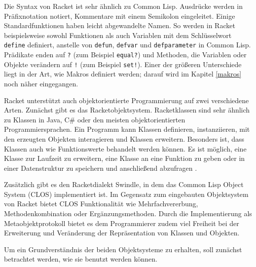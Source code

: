 Die Syntax von Racket ist sehr ähnlich zu Common Lisp. Ausdrücke werden in Präfixnotation notiert, Kommentare mit einem Semikolon eingeleitet. Einige Standardfunktionen haben leicht abgewandelte Namen. So werden in Racket beispielsweise sowohl Funktionen als auch Variablen mit dem Schlüsselwort \texttt{define} definiert, anstelle von \texttt{defun}, \texttt{defvar} und \texttt{defparameter} in Common Lisp. Prädikate enden auf \texttt{?} (zum Beispiel \texttt{equal?}) und Methoden, die Variablen oder Objekte verändern auf \texttt{!} (zum Beispiel \texttt{set!}). Einer der größeren Unterschiede liegt in der Art, wie Makros definiert werden; darauf wird im Kapitel \ref{makros} noch näher eingegangen.

Racket unterstützt auch objektorientierte Programmierung auf zwei verschiedene Arten. Zunächst gibt es das Racketobjektsystem. Racketklassen sind sehr ähnlich zu Klassen in Java, C\# oder den meisten objektorientierten Programmiersprachen. Ein Programm kann Klassen definieren, instanziieren, mit den erzeugten Objekten interagieren und Klassen erweitern. Besonders ist, dass Klassen auch wie Funktionswerte behandelt werden können. Es ist möglich, eine Klasse zur Laufzeit zu erweitern, eine Klasse an eine Funktion zu geben oder in einer Datenstruktur zu speichern und anschließend abzufragen \cite{neu-edu}. 

Zusätzlich gibt es den Racketdialekt Swindle, in dem das Common Lisp Object System (CLOS) implementiert ist. Im Gegensatz zum eingebauten Objektsystem von Racket bietet CLOS Funktionalität wie Mehrfachvererbung, Methodenkombination oder Ergänzungsmethoden. Durch die Implementierung als Metaobjektprotokoll bietet es dem Programmierer zudem viel Freiheit bei der Erweiterung und Veränderung der Repräsentation von Klassen und Objekten.

Um ein Grundverständnis der beiden Objektsysteme zu erhalten, soll zunächst betrachtet werden, wie sie benutzt werden können. %

